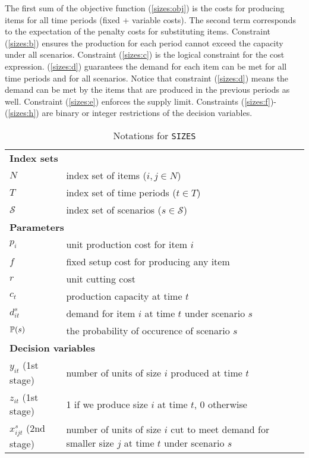 The first sum of the objective function (\ref{sizes:obj}) is the costs for producing items for all time periods (fixed + variable costs). The second term corresponds to the expectation of the penalty costs for substituting items. Constraint (\ref{sizes:b}) ensures the production for each period cannot exceed the capacity under all scenarios. Constraint (\ref{sizes:c}) is the logical constraint for the cost expression. (\ref{sizes:d}) guarantees the demand for each item can be met for all time periods and for all scenarios. Notice that constraint (\ref{sizes:d}) means the demand can be met by the items that are produced in the previous periods as well. Constraint (\ref{sizes:e}) enforces the supply limit. Constraints (\ref{sizes:f})-(\ref{sizes:h}) are binary or integer restrictions of the decision variables.

\begin{table}[H]
	\caption{Notations for \texttt{SIZES}}
	\label{sizes:notation}
	\resizebox{\textwidth}{!}
	{
		\begin{tabular}{ll}
			\toprule
			\multicolumn{2}{l}{\textbf{Index sets}} \\
			$N$ & \textrm{index set of items ($i,j\in N$)} \\ 
			$T$ & \textrm{index set of time periods ($t\in T$)} \\ 
			$\mathcal{S}$ & \textrm{index set of scenarios ($s\in\mathcal{S}$)}\\ \midrule
			\multicolumn{2}{l}{\textbf{Parameters}} \\
			$p_{i}$ & unit production cost for item $i$\\
			$f$	& fixed setup cost for producing any item\\
			$r$ & unit cutting cost\\ 
			$c_{t}$ & production capacity at time $t$\\
			$d_{it}^s$ &	demand for item $i$ at time $t$ under scenario $s$\\
			$\operatorname*{\mathbb{P}}(s)$ & the probability of occurence of scenario $s$\\ \midrule
			\multicolumn{2}{l}{\textbf{Decision variables}} \\
			$y_{it}$ (1st stage)  & number of units of size $i$ produced at time $t$ \\
			$z_{it}$ (1st stage)& 1 if we produce size $i$ at time $t$, 0 otherwise\\
			$x_{ijt}^s$ (2nd stage) & number of units of size $i$ cut to meet demand for smaller size $j$ at time $t$ under scenario $s$\\ 
			\bottomrule
		\end{tabular}
	}
\end{table} 

